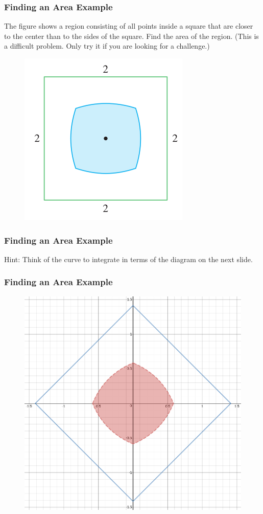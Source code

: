 \documentclass[xcolor=dvipsnames]{beamer}
\begin{document}
\begin{frame}
  \frametitle{Finding an Area Example}
  {\ubung} The figure shows a region consisting of all points inside a
  square that are closer to the center than to the sides of the
  square. Find the area of the region. (This is a difficult problem.
  Only try it if you are looking for a challenge.)
  \begin{figure}[h]
    \includegraphics[scale=0.5]{./diagrams/squarish.png}
  \end{figure}
\end{frame}

\begin{frame}
  \frametitle{Finding an Area Example}
  Hint: Think of the curve to integrate in terms of the diagram on the
  next slide.
\end{frame}

\begin{frame}
  \frametitle{Finding an Area Example}
  \begin{figure}[h]
    \includegraphics[scale=0.4]{./diagrams/squarish-desmos.png}
  \end{figure}
\end{frame}
\end{document}
